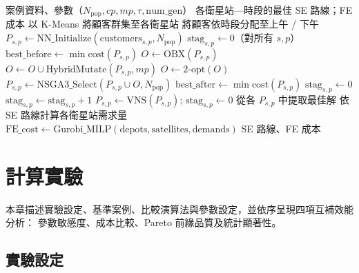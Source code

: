 \documentclass[11pt, a4paper]{article}
\numberwithin{equation}{section}
\begin{document}
\begin{algorithm}[ht]
\caption{HNSGA-III for 2E-MD-MD-MP-CVRP-SPD}
\label{alg:hnsga3}
\begin{algorithmic}[1]
\Require 案例資料、參數（$N_{\mathrm{pop}},cp,mp,\tau,\mathrm{num\_gen}$）
\Ensure 各衛星站—時段的最佳 SE 路線；FE 成本
\State 以 K-Means 將顧客群集至各衛星站
\State 將顧客依時段分配至上午 / 下午
  \State $P_{s,p} \leftarrow \mathrm{NN\_Initialize}(\mathrm{customers}_{s,p},N_{\mathrm{pop}})$
         \quad{}
\EndFor
\State $\mathrm{stag}_{s,p} \leftarrow 0$（對所有 $s,p$）
    \State $\mathrm{best\_before} \leftarrow \min\mathrm{cost}(P_{s,p})$
      \State $O \leftarrow \mathrm{OBX}(P_{s,p})$
    \EndIf
    \State $O \leftarrow O \cup \mathrm{HybridMutate}(P_{s,p},mp)$
    \State $O \leftarrow \mathrm{2\text{-}opt}(O)$
    \State $P_{s,p} \leftarrow \mathrm{NSGA3\_Select}(P_{s,p}\cup O,N_{\mathrm{pop}})$
    \State $\mathrm{best\_after} \leftarrow \min\mathrm{cost}(P_{s,p})$
      \State $\mathrm{stag}_{s,p} \leftarrow 0$
    \Else
      \State $\mathrm{stag}_{s,p} \leftarrow \mathrm{stag}_{s,p}+1$
    \EndIf
      \State $P_{s,p} \leftarrow \mathrm{VNS}(P_{s,p})$;\quad
             $\mathrm{stag}_{s,p} \leftarrow 0$
    \EndIf
  \EndFor
\EndFor
\State 從各 $P_{s,p}$ 中提取最佳解
\State 依 SE 路線計算各衛星站需求量
\State $\mathrm{FE\_cost} \leftarrow \mathrm{Gurobi\_MILP}(\mathrm{depots},\mathrm{satellites},\mathrm{demands})$
\State \Return SE 路線、FE 成本
\end{algorithmic}
\end{algorithm}

\section{計算實驗}
\label{sec:exp}

本章描述實驗設定、基準案例、比較演算法與參數設定，並依序呈現四項互補效能分析：
參數敏感度、成本比較、Pareto 前緣品質及統計顯著性。

\subsection{實驗設定}
\end{document}
